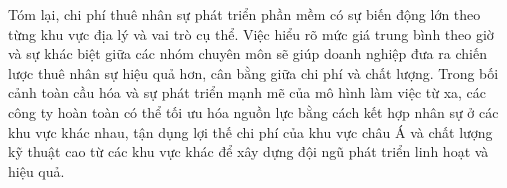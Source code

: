     \begin{flushleft}
      \hspace*{0.8cm}Tóm lại, chi phí thuê nhân sự phát triển phần mềm có sự biến động lớn theo từng khu vực địa lý và vai trò cụ thể. Việc hiểu rõ mức giá trung bình theo giờ và sự khác biệt giữa các nhóm chuyên môn sẽ giúp doanh nghiệp đưa ra chiến lược thuê nhân sự hiệu quả hơn, cân bằng giữa chi phí và chất lượng. Trong bối cảnh toàn cầu hóa và sự phát triển mạnh mẽ của mô hình làm việc từ xa, các công ty hoàn toàn có thể tối ưu hóa nguồn lực bằng cách kết hợp nhân sự ở các khu vực khác nhau, tận dụng lợi thế chi phí của khu vực châu Á và chất lượng kỹ thuật cao từ các khu vực khác để xây dựng đội ngũ phát triển linh hoạt và hiệu quả.
    \end{flushleft}